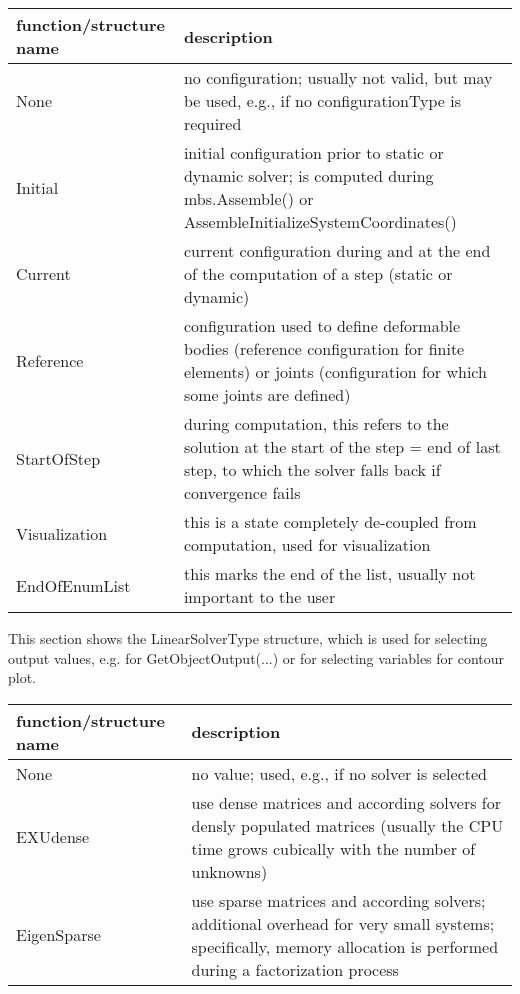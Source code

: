 \begin{center}
\footnotesize
\begin{longtable}{| p{8cm} | p{8cm} |} 
\hline
{\bf function/structure name} & {\bf description}\\ \hline
  None & no configuration; usually not valid, but may be used, e.g., if no configurationType is required\\ \hline 
  Initial & initial configuration prior to static or dynamic solver; is computed during mbs.Assemble() or AssembleInitializeSystemCoordinates()\\ \hline 
  Current & current configuration during and at the end of the computation of a step (static or dynamic)\\ \hline 
  Reference & configuration used to define deformable bodies (reference configuration for finite elements) or joints (configuration for which some joints are defined)\\ \hline 
  StartOfStep & during computation, this refers to the solution at the start of the step = end of last step, to which the solver falls back if convergence fails\\ \hline 
  Visualization & this is a state completely de-coupled from computation, used for visualization\\ \hline 
  EndOfEnumList & this marks the end of the list, usually not important to the user\\ \hline 
\end{longtable}
\end{center}

This section shows the LinearSolverType structure, which is used for selecting output values, e.g. for GetObjectOutput(...) or for selecting variables for contour plot.



\begin{center}
\footnotesize
\begin{longtable}{| p{8cm} | p{8cm} |} 
\hline
{\bf function/structure name} & {\bf description}\\ \hline
  None & no value; used, e.g., if no solver is selected\\ \hline 
  EXUdense & use dense matrices and according solvers for densly populated matrices (usually the CPU time grows cubically with the number of unknowns)\\ \hline 
  EigenSparse & use sparse matrices and according solvers; additional overhead for very small systems; specifically, memory allocation is performed during a factorization process\\ \hline 
\end{longtable}
\end{center}
